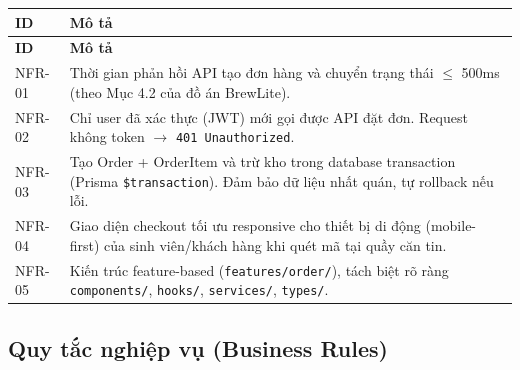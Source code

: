 \documentclass[12pt,a4paper]{article}
\begin{document}
\begin{longtable}{|l|p{10cm}|}
\hline
\textbf{ID} & \textbf{Mô tả} \\
\hline
\endfirsthead
\hline
\textbf{ID} & \textbf{Mô tả} \\
\hline
\endhead

NFR-01 & Thời gian phản hồi API tạo đơn hàng và chuyển trạng thái $\leq$ 500ms (theo Mục 4.2 của đồ án BrewLite). \\
\hline
NFR-02 & Chỉ user đã xác thực (JWT) mới gọi được API đặt đơn. Request không token $\to$ \texttt{401 Unauthorized}. \\
\hline
NFR-03 & Tạo Order + OrderItem và trừ kho trong database transaction (Prisma \texttt{\$transaction}). Đảm bảo dữ liệu nhất quán, tự rollback nếu lỗi. \\
\hline
NFR-04 & Giao diện checkout tối ưu responsive cho thiết bị di động (mobile-first) của sinh viên/khách hàng khi quét mã tại quầy căn tin. \\
\hline
NFR-05 & Kiến trúc feature-based (\texttt{features/order/}), tách biệt rõ ràng \texttt{components/}, \texttt{hooks/}, \texttt{services/}, \texttt{types/}. \\
\hline
\end{longtable}

\subsection{Quy tắc nghiệp vụ (Business Rules)}
\end{document}
